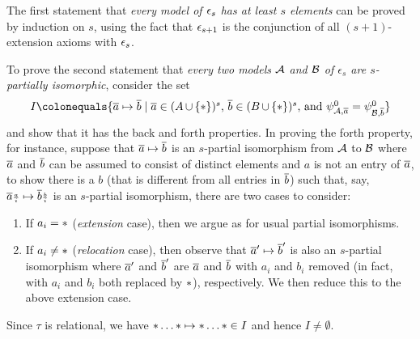 \begin{enumerate}[1.]
The first statement that \emph{every model of $\conjextaxm{s}$ has at least $s$ elements} can be proved by induction on $s$, using the fact that $\conjextaxm{s + 1}$ is the conjunction of all $(s + 1)$-extension axioms with $\conjextaxm{s}$.

To prove the second statement that \emph{every two models $\mathcal{A}$ and $\mathcal{B}$ of $\epsilon_s$ are $s$-partially isomorphic}, consider the set
\[
I \defas \sett{\vect{a} \mapsto \vect{b}}{\mathmode{\vect{a} \in \cartpwr{(A \union \sete{\off})}{s}}, \mathmode{\vect{b} \in \cartpwr{(B \union \sete{\off})}{s}}, and \mathmode{\ityp{0}{\strct{A}, \vect{a}} = \ityp{0}{\strct{B}, \vect{b}}}}
\]
and show that it has the back and forth properties. In proving the forth property, for instance, suppose that $\overline{a} \mapsto \overline{b}$ is an $s$-partial isomorphism from $\mathcal{A}$ to $\mathcal{B}$ where $\overline{a}$ and $\overline{b}$ can be assumed to consist of distinct elements and $a$ is not an entry of $\overline{a}$, to show there is a $b$ (that is different from all entries in $\overline{b}$) such that, say, $\overline{a}{\scriptstyle\frac{a}{i}} \mapsto \overline{b}{\scriptstyle\frac{b}{i}}$ is an $s$-partial isomorphism, there are two cases to consider:
\begin{enumerate}[(1)]
\item If $a_i = \ast$ (\emph{extension} case), then we argue as for usual partial isomorphisms.
\item If $a_i \neq \ast$ (\emph{relocation} case), then observe that $\overline{a}' \mapsto \overline{b}'$ is also an $s$-partial isomorphism where $\overline{a}'$ and $\overline{b}'$ are $\overline{a}$ and $\overline{b}$ with $a_i$ and $b_i$ removed (in fact, with $a_i$ and $b_i$ both replaced by $\ast$), respectively. We then reduce this to the above extension case.
\end{enumerate}
Since $\tau$ is relational, we have $\ast\ldots\ast \mapsto \ast\ldots\ast \in I$ and hence $I \neq \emptyset$.


\end{enumerate}
